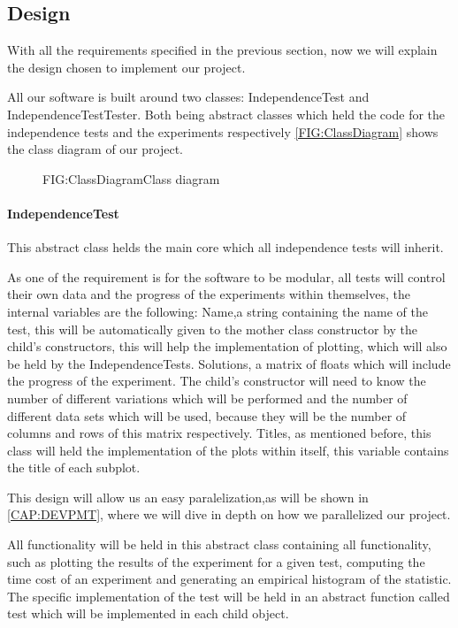 \subsection{Design}

With all the requirements specified in the previous section, now we will explain the design chosen to implement our project.

All our software is built around two classes: IndependenceTest and IndependenceTestTester. Both being abstract classes which held the code for the independence tests and the experiments respectively \ref{FIG:ClassDiagram} shows the class diagram of our project.

\begin{figure}[Class diagram]{FIG:ClassDiagram}{Class diagram}
\end{figure}

\paragraph{IndependenceTest}

This abstract class helds the main core which all independence tests will inherit.

As one of the requirement is for the software to be modular, all tests will control their own data and the progress of the experiments within themselves, the internal variables are the following: 
Name,a string containing the name of the test, this will be automatically given to the mother class constructor by the child's constructors, this will help the implementation of plotting, which will also be held by the IndependenceTests.
Solutions, a matrix of floats which will include the progress of the experiment. The child's constructor will need to know the number of different variations which will be performed and the number of different data sets which will be used, because they will be the number of columns and rows of this matrix respectively.
Titles, as mentioned before, this class will held the implementation of the plots within itself, this variable contains the title of each subplot.

This design will allow us an easy paralelization,as will be shown in \cref{CAP:DEVPMT}, where we will dive in depth on how we parallelized our project.

All functionality will be held in this abstract class containing all functionality, such as plotting the results of the experiment for a given test, computing the time cost of an experiment and generating an empirical histogram of the statistic. The specific implementation of the test will be held in an abstract function called test which will be implemented in each child object.

